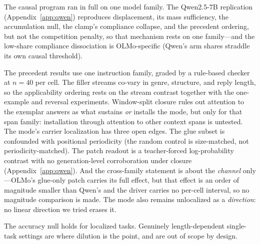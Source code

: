 \documentclass{article}
\begin{document}
The causal program ran in full on one model family. The
Qwen2.5-7B replication (Appendix~\ref{app:qwen}) reproduces displacement, its mass
sufficiency, the accumulation null, the clamp's compliance collapse, and the precedent
ordering, but not the competition penalty, so that mechanism rests on one family---and the
low-share compliance dissociation is OLMo-specific (Qwen's arm shares straddle its own causal
threshold).

The precedent results
use one instruction family, graded by a rule-based checker at $n{=}40$ per cell. The filler
streams co-vary in genre, structure, and reply length, so the applicability ordering rests on
the stream contrast together with the one-example and reversal experiments. Window-split
closure rules out attention to the exemplar answers as what sustains \emph{or} installs the
mode, but only for that span family: installation through attention to other context spans is
untested. The mode's carrier localization has three open edges. The glue subset is confounded
with positional periodicity (the random control is size-matched, not periodicity-matched). The
patch readout is a teacher-forced log-probability contrast with no generation-level
corroboration under closure (Appendix~\ref{app:qwen}). And
the cross-family statement is about the \emph{channel} only---OLMo's glue-only patch carries
its full effect, but that effect is an order of magnitude smaller than Qwen's and the driver
carries no per-cell interval, so no magnitude comparison is made. The mode also remains
unlocalized as a \emph{direction}: no linear direction we tried erases it.

The accuracy null holds for localized tasks.
Genuinely length-dependent single-task settings are where dilution is the point, and are out of
scope by design.
\end{document}
